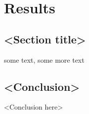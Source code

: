 \chapter{Results}

\section{<Section title>}
some text\cite{citation-2-name-here}, some more text

\section{<Conclusion>}
<Conclusion here>